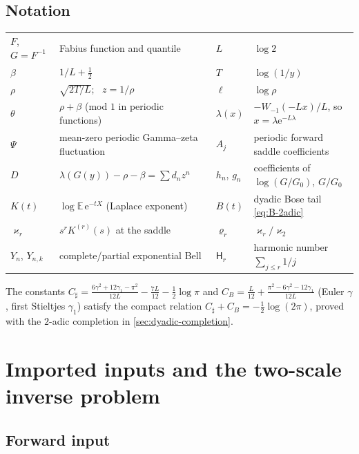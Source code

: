 \documentclass[11pt,oneside]{article}
\numberwithin{equation}{section}
\theoremstyle{definition}
\theoremstyle{remark}
\newcommand{\E}{\mathbb E}
\newcommand{\e}{\mathrm e}
\newcommand{\LambertW}{W}
\newcommand{\Bell}{Y}
\newcommand{\Csharp}{C_{\sharp}}
\newcommand{\CB}{C_{B}}
\newcommand{\Gzero}{G_0}
\newcommand{\Hnum}{\mathsf H}
\begin{document}
\subsection*{Notation}

\begin{center}
\small
\begin{tabular}{@{}llll@{}}
\toprule
$F$, $G=F^{-1}$ & Fabius function and quantile &
$L$ & $\log2$\\
$\beta$ & $1/L+\tfrac12$ &
$T$ & $\log(1/y)$\\
$\rho$ & $\sqrt{2T/L}$; \ $z=1/\rho$ &
$\ell$ & $\log\rho$\\
$\theta$ & $\rho+\beta$ (mod $1$ in periodic functions) &
$\lambda(x)$ & $-\LambertW_{-1}(-Lx)/L$, so $x=\lambda\e^{-L\lambda}$\\
$\Psi$ & mean-zero periodic Gamma--zeta fluctuation &
$A_j$ & periodic forward saddle coefficients\\
$D$ & $\lambda(G(y))-\rho-\beta=\sum d_nz^{n}$ &
$h_n$, $g_n$ & coefficients of $\log(G/\Gzero)$, $G/\Gzero$\\
$K(t)$ & $\log\E\,\e^{-tX}$ (Laplace exponent) &
$B(t)$ & dyadic Bose tail \eqref{eq:B-2adic}\\
$\varkappa_r$ & $s^{r}K^{(r)}(s)$ at the saddle &
$\varrho_r$ & $\varkappa_r/\varkappa_2$\\
$\Bell_n$, $\Bell_{n,k}$ & complete/partial exponential Bell &
$\Hnum_r$ & harmonic number $\sum_{j\le r}1/j$\\
\bottomrule
\end{tabular}
\end{center}
The constants
$\Csharp=\frac{6\gamma^{2}+12\gamma_1-\pi^{2}}{12L}
-\frac{7L}{12}-\frac12\log\pi$ and
$\CB=\frac{L}{12}+\frac{\pi^{2}-6\gamma^{2}-12\gamma_1}{12L}$
(Euler $\gamma$, first Stieltjes $\gamma_1$) satisfy the compact
relation $\Csharp+\CB=-\tfrac12\log(2\pi)$, proved with the
$2$-adic completion in \cref{sec:dyadic-completion}.

\section{Imported inputs and the two-scale inverse problem}
\label{sec:inputs}

\subsection{Forward input}
\end{document}
